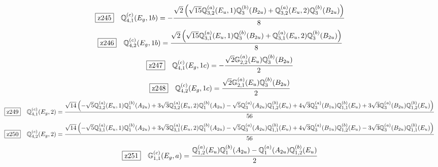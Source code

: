 \documentclass[fleqn,10pt,landscape]{jsarticle}
\begin{document}
\begin{dmath*}
\hspace*{3mm}\fbox{z245}\quad \mathbb{Q}_{4,1}^{(c)}(E_{g},1b)=- \frac{\sqrt{2} \left(\sqrt{15} \mathbb{Q}_{3,2}^{(a)}(E_{u},1) \mathbb{Q}_{3}^{(b)}(B_{2u}) + \mathbb{Q}_{3,2}^{(a)}(E_{u},2) \mathbb{Q}_{3}^{(b)}(B_{2u})\right)}{8}
\end{dmath*}
\begin{dmath*}
\hspace*{3mm}\fbox{z246}\quad \mathbb{Q}_{4,2}^{(c)}(E_{g},1b)=\frac{\sqrt{2} \left(\sqrt{15} \mathbb{Q}_{3,1}^{(a)}(E_{u},1) \mathbb{Q}_{3}^{(b)}(B_{2u}) + \mathbb{Q}_{3,1}^{(a)}(E_{u},2) \mathbb{Q}_{3}^{(b)}(B_{2u})\right)}{8}
\end{dmath*}
\begin{dmath*}
\hspace*{3mm}\fbox{z247}\quad \mathbb{Q}_{4,1}^{(c)}(E_{g},1c)=- \frac{\sqrt{2} \mathbb{G}_{2,2}^{(a)}(E_{u}) \mathbb{Q}_{3}^{(b)}(B_{2u})}{2}
\end{dmath*}
\begin{dmath*}
\hspace*{3mm}\fbox{z248}\quad \mathbb{Q}_{4,2}^{(c)}(E_{g},1c)=\frac{\sqrt{2} \mathbb{G}_{2,1}^{(a)}(E_{u}) \mathbb{Q}_{3}^{(b)}(B_{2u})}{2}
\end{dmath*}
\begin{dmath*}
\hspace*{3mm}\fbox{z249}\quad \mathbb{Q}_{4,1}^{(c)}(E_{g},2)=\frac{\sqrt{14} \left(- \sqrt{5} \mathbb{Q}_{3,2}^{(a)}(E_{u},1) \mathbb{Q}_{1}^{(b)}(A_{2u}) + 3 \sqrt{3} \mathbb{Q}_{3,2}^{(a)}(E_{u},2) \mathbb{Q}_{1}^{(b)}(A_{2u}) - \sqrt{5} \mathbb{Q}_{3}^{(a)}(A_{2u}) \mathbb{Q}_{1,2}^{(b)}(E_{u}) + 4 \sqrt{3} \mathbb{Q}_{3}^{(a)}(B_{1u}) \mathbb{Q}_{1,1}^{(b)}(E_{u}) + 3 \sqrt{3} \mathbb{Q}_{3}^{(a)}(B_{2u}) \mathbb{Q}_{1,2}^{(b)}(E_{u})\right)}{56}
\end{dmath*}
\begin{dmath*}
\hspace*{3mm}\fbox{z250}\quad \mathbb{Q}_{4,2}^{(c)}(E_{g},2)=\frac{\sqrt{14} \left(- \sqrt{5} \mathbb{Q}_{3,1}^{(a)}(E_{u},1) \mathbb{Q}_{1}^{(b)}(A_{2u}) + 3 \sqrt{3} \mathbb{Q}_{3,1}^{(a)}(E_{u},2) \mathbb{Q}_{1}^{(b)}(A_{2u}) - \sqrt{5} \mathbb{Q}_{3}^{(a)}(A_{2u}) \mathbb{Q}_{1,1}^{(b)}(E_{u}) + 4 \sqrt{3} \mathbb{Q}_{3}^{(a)}(B_{1u}) \mathbb{Q}_{1,2}^{(b)}(E_{u}) - 3 \sqrt{3} \mathbb{Q}_{3}^{(a)}(B_{2u}) \mathbb{Q}_{1,1}^{(b)}(E_{u})\right)}{56}
\end{dmath*}
\begin{dmath*}
\hspace*{3mm}\fbox{z251}\quad \mathbb{G}_{1,1}^{(c)}(E_{g},a)=\frac{\mathbb{Q}_{1,2}^{(a)}(E_{u}) \mathbb{Q}_{1}^{(b)}(A_{2u}) - \mathbb{Q}_{1}^{(a)}(A_{2u}) \mathbb{Q}_{1,2}^{(b)}(E_{u})}{2}
\end{dmath*}
\end{document}
